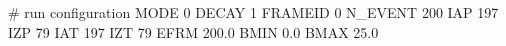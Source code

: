 # run configuration
MODE    0
DECAY   1
FRAMEID 0
N_EVENT 200
IAP     197
IZP     79
IAT     197
IZT     79
EFRM    200.0
BMIN    0.0
BMAX    25.0

